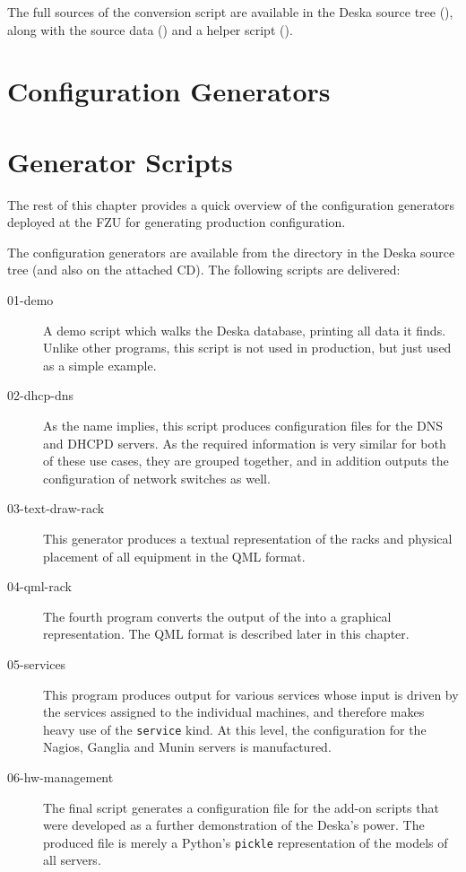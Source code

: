 \documentclass[deska]{subfiles}
\begin{document}
The full sources of the conversion script are available in the Deska source tree (), along
with the source data () and a helper script ().

\section{Configuration Generators}
\label{sec:fzu-cfggen}

\section{Generator Scripts}

The rest of this chapter provides a quick overview of the configuration generators deployed at the FZU for generating
production configuration.

The configuration generators are available from the directory  in the Deska source tree
(and also on the attached CD).  The following scripts are delivered:

\begin{description}
    \item[01-demo] A demo script which walks the Deska database, printing all data it finds.  Unlike other programs,
        this script is not used in production, but just used as a simple example.
    \item[02-dhcp-dns] As the name implies, this script produces configuration files for the DNS and DHCPD servers.  As
        the required information is very similar for both of these use cases, they are grouped together, and in addition
        outputs the configuration of network switches as well.
    \item[03-text-draw-rack] This generator produces a textual representation of the racks and physical placement of all
        equipment in the QML format.
    \item[04-qml-rack] The fourth program converts the output of the  into a graphical
        representation.  The QML format is described later in this chapter.
    \item[05-services] This program produces output for various services whose input is driven by the services assigned
        to the individual machines, and therefore makes heavy use of the {\tt service} kind.  At this level, the
        configuration for the Nagios, Ganglia and Munin servers is manufactured.
    \item[06-hw-management] The final script generates a configuration file for the add-on scripts that were developed
        as a further demonstration of the Deska's power.  The produced file is merely a Python's {\tt pickle}
        representation of the models of all servers.
\end{description}
\end{document}
